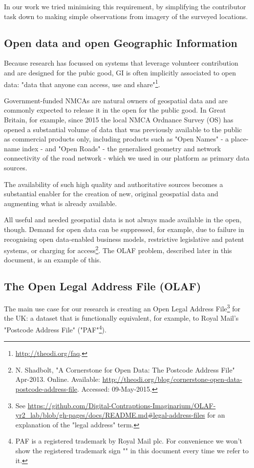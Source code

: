 In our work we tried minimising this requirement, by simplifying the contributor task down to making simple observations from imagery of the surveyed locations.

\subsection{Open data and open Geographic Information}
\label{open-data-and-gi}

Because research has focussed on systems that leverage volunteer contribution and are designed for the pubic good, GI is often implicitly associated to open data: "data that anyone can access, use and share"\footnote{\url{http://theodi.org/faq}.}. 

Government-funded NMCAs are natural owners of geospatial data and are commonly expected to release it in the open for the public good. In Great Britain, for example, since 2015 the local NMCA Ordnance Survey (OS) has opened a substantial volume of data that was previously available to the public as commercial products only, including products such as "Open Names" - a place-name index - and "Open Roads" - the generalised geometry and network connectivity of the road network - which we used in our platform as primary data sources.
	
The availability of such high quality and authoritative sources becomes a substantial enabler for the creation of new, original geospatial data and augmenting what is already available.

All useful and needed geospatial data is not always made available in the open, though. Demand for open data can be suppressed, for example, due to failure in recognising open data-enabled business models, restrictive legislative and patent systems, or charging for access\footnote{N. Shadbolt, "A Cornerstone for Open Data: The Postcode Address File" Apr-2013. Online. Available: \url{http://theodi.org/blog/cornerstone-open-data-postcode-address-file}. Accessed: 09-May-2015.}. The OLAF problem, described later in this document, is an example of this.
	
\subsection{The Open Legal Address File (OLAF)}
\label{subs:the-problem-of-creating-an-olaf}

The main use case for our research is creating an Open Legal Address File\footnote{See \url{https://github.com/Digital-Contraptions-Imaginarium/OLAF-yr2_lab/blob/gh-pages/docs/README.md#legal-address-files} for an explanation of the "legal address" term.} for the UK: a dataset that is functionally equivalent, for example, to Royal Mail's "Postcode Address File" ("PAF"\footnote{PAF is a registered trademark by Royal Mail plc. For convenience we won't show the registered trademark sign "\textregistered" in this document every time we refer to it.}). 

